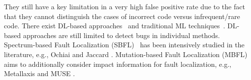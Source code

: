 They still have a key limitation in a very high false positive rate
due to the fact that they cannot distinguish the cases of incorrect
code versus infrequent/rare code.  There exist DL-based
approaches~\cite{Pradel-2018,Wang-2016b} and traditional ML
techniques~\cite{Engler-2001,Li-2005,Wasylkowski-2017,
  Wang-2016b,Wang-2016,Liang-2016}.
DL-based approaches are still limited to detect bugs in individual
methods.
Spectrum-based Fault Localization (SBFL)~\cite{zhang2011localizing, abreu2007accuracy, jones2005empirical, abreu2006evaluation, naish2011model, wong2007effective, liblit2005scalable, lucia2014extended, keller2017critical} has been intensively studied in the literature, e.g., Ochiai \cite{abreu2006evaluation} and Jaccard \cite{abreu2007accuracy}. 
Mutation-based Fault Localization (MBFL)~\cite{moon2014ask, zhang2013injecting,budd1981mutation, zhang2010test, musco2017large} aims to additionally consider impact information for fault localization, e.g., Metallaxis \cite{papadakis2012using, papadakis2015metallaxis} and MUSE \cite{moon2014ask}.
%

